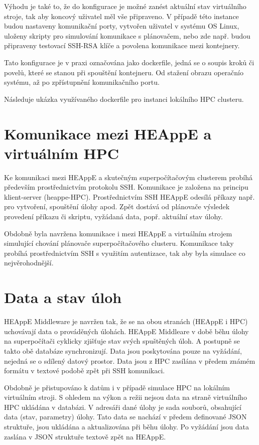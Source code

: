 Výhodu je také to, že do konfigurace je možné zanést aktuální stav virtuálního stroje, tak aby koncový uživatel měl vše připraveno. V případě této instance budou nastaveny komunikační porty, vytvořen uživatel v systému OS Linux, uloženy skripty pro simulování komunikace s plánovačem, nebo zde např. budou připraveny testovací SSH-RSA klíče a povolena komunikace mezi kontejnery.

Tato konfigurace je v praxi označována jako dockerfile, jedná se o soupis kroků či povelů, které se stanou při spouštění kontejneru. Od stažení obrazu operačnío systému, až po zpřístupnění komunikačního portu.

Následuje ukázka využívaného dockerfile pro instanci lokálního HPC clusteru.

\hfill \break


\section{Komunikace mezi HEAppE a virtuálním HPC}
Ke komunikaci mezi HEAppE a skutečným superpočítačovým clusterem probíhá především prostřednictvím protokolu SSH. Komunikace je založena na principu klient-server (heappe-HPC). Prostřednictvím SSH HEAppE odesílá příkazy např. pro vytvoření, spouštění úlohy apod. Zpět dostává od plánovače výsledek provedení příkazu či skriptu, vyžádaná data, popř. aktuální stav úlohy.

Obdobně byla navržena komunikace i mezi HEAppE a virtuálním strojem simulující chování plánovače superpočítačového clusteru. Komunikace taky probíhá prostřednictvím SSH s využitím autentizace, tak aby byla simulace co nejvěrohodnější.

\section{Data a stav úloh}
HEAppE Middleware je navržen tak, že se na obou stranách (HEAppE i HPC) uchovávají data o prováděných úlohách. HEAppE Middleare v době běhu úlohy na superpočítači cyklicky zjišťuje stav svých spuštěných úloh. A postupně se takto obě databáze synchronizují. Data jsou poskytována pouze na vyžádání, nejedná se o sdílený datový prostor. Data jsou z HPC zasílána v předem známém formátu v textové podobě zpět při SSH komunikaci.

Obdobně je přistupováno k datům i v případě simulace HPC na lokálním virtuálním stroji. S ohledem na výkon a režii nejsou data na straně virtuálního HPC ukládána v databázi. V adresáři dané úlohy je sada souborů, obsahující data (stav, parametry) úlohy. Tato data se nachází v předem definované JSON struktuře, jsou ukládána a aktualizována při běhu úlohy. Po vyžádání jsou data zaslána v JSON struktuře textově zpět na HEAppE.

